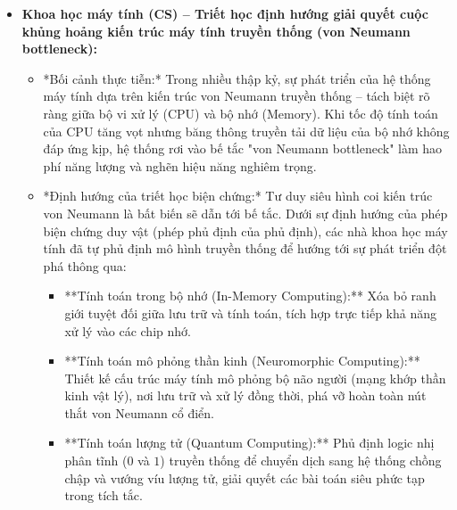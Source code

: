 \documentclass[12pt,a4paper]{article}
\begin{document}
{\begin{itemize}
    \item \textbf{Khoa học máy tính (CS) -- Triết học định hướng giải quyết cuộc khủng hoảng kiến trúc máy tính truyền thống (von Neumann bottleneck):}
    \begin{itemize}
        \item *Bối cảnh thực tiễn:* Trong nhiều thập kỷ, sự phát triển của hệ thống máy tính dựa trên kiến trúc von Neumann truyền thống -- tách biệt rõ ràng giữa bộ vi xử lý (CPU) và bộ nhớ (Memory). Khi tốc độ tính toán của CPU tăng vọt nhưng băng thông truyền tải dữ liệu của bộ nhớ không đáp ứng kịp, hệ thống rơi vào bế tắc "von Neumann bottleneck" làm hao phí năng lượng và nghẽn hiệu năng nghiêm trọng.
        \item *Định hướng của triết học biện chứng:* Tư duy siêu hình coi kiến trúc von Neumann là bất biến sẽ dẫn tới bế tắc. Dưới sự định hướng của phép biện chứng duy vật (phép phủ định của phủ định), các nhà khoa học máy tính đã tự phủ định mô hình truyền thống để hướng tới sự phát triển đột phá thông qua:
        \begin{itemize}
            \item **Tính toán trong bộ nhớ (In-Memory Computing):** Xóa bỏ ranh giới tuyệt đối giữa lưu trữ và tính toán, tích hợp trực tiếp khả năng xử lý vào các chip nhớ.
            \item **Tính toán mô phỏng thần kinh (Neuromorphic Computing):** Thiết kế cấu trúc máy tính mô phỏng bộ não người (mạng khớp thần kinh vật lý), nơi lưu trữ và xử lý đồng thời, phá vỡ hoàn toàn nút thắt von Neumann cổ điển.
            \item **Tính toán lượng tử (Quantum Computing):** Phủ định logic nhị phân tĩnh ($0$ và $1$) truyền thống để chuyển dịch sang hệ thống chồng chập và vướng víu lượng tử, giải quyết các bài toán siêu phức tạp trong tích tắc.
        \end{itemize}
    \end{itemize}


\end{itemize}}
\end{document}
